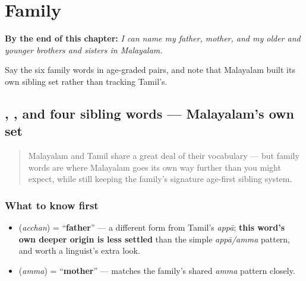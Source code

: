 
\chapter{Family}
\label{ch:ml-family}

\begin{chapteropening}
\textbf{By the end of this chapter:} \emph{I can name my father, mother, and my older and younger brothers and sisters in Malayalam.}

Say the six family words in age-graded pairs, and note that Malayalam built its own sibling set rather than tracking Tamil's.
\end{chapteropening}

\section[\texorpdfstring{\ml{അച്ഛൻ} \ml{അമ്മ} \ml{ചേട്ടൻ} … (acchan amma …)}{അച്ഛൻ അമ്മ ചേട്ടൻ … (acchan amma …)}]{, , and four sibling words — Malayalam's own set}

\label{lesson:ML-C12-kudumbam}



\begin{quote}
Malayalam and Tamil share a great deal of their vocabulary — but family words are where Malayalam goes its own way further than you might expect, while still keeping the family's signature age-first sibling system.
\end{quote}

\subsection*{What to know first}
\begin{itemize}
\raggedright
  \item \textbf{} (\emph{acchan}) = \textquotedblleft{}\textbf{father}\textquotedblright{} — a different form from Tamil's \emph{appā}; \textbf{this word's own deeper origin is less settled} than the simple \emph{appā/amma} pattern, and worth a linguist's extra look.
  \item \textbf{} (\emph{amma}) = \textquotedblleft{}\textbf{mother}\textquotedblright{} — matches the family's shared \emph{amma} pattern closely.
\end{itemize}

